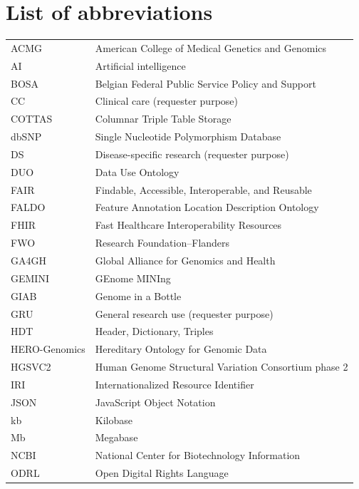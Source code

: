 \documentclass[pdflatex,sn-mathphys-num,referee]{sn-jnl}
\begin{document}
\section*{List of abbreviations}
\begin{longtable}{@{}>{\raggedright\arraybackslash}p{}>{\raggedright\arraybackslash}p{}@{}}
ACMG & American College of Medical Genetics and Genomics\\
AI & Artificial intelligence\\
BOSA & Belgian Federal Public Service Policy and Support\\
CC & Clinical care (requester purpose)\\
COTTAS & Columnar Triple Table Storage\\
dbSNP & Single Nucleotide Polymorphism Database\\
DS & Disease-specific research (requester purpose)\\
DUO & Data Use Ontology\\
FAIR & Findable, Accessible, Interoperable, and Reusable\\
FALDO & Feature Annotation Location Description Ontology\\
FHIR & Fast Healthcare Interoperability Resources\\
FWO & Research Foundation--Flanders\\
GA4GH & Global Alliance for Genomics and Health\\
GEMINI & GEnome MINIng\\
GIAB & Genome in a Bottle\\
GRU & General research use (requester purpose)\\
HDT & Header, Dictionary, Triples\\
HERO-Genomics & Hereditary Ontology for Genomic Data\\
HGSVC2 & Human Genome Structural Variation Consortium phase 2\\
IRI & Internationalized Resource Identifier\\
JSON & JavaScript Object Notation\\
kb & Kilobase\\
Mb & Megabase\\
NCBI & National Center for Biotechnology Information\\
ODRL & Open Digital Rights Language\\

\end{longtable}
\end{document}
